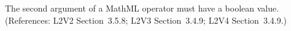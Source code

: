 The second argument of a MathML  operator must have
a boolean value.  (References: L2V2 Section~3.5.8; L2V3 Section~3.4.9; L2V4 Section~3.4.9.)
